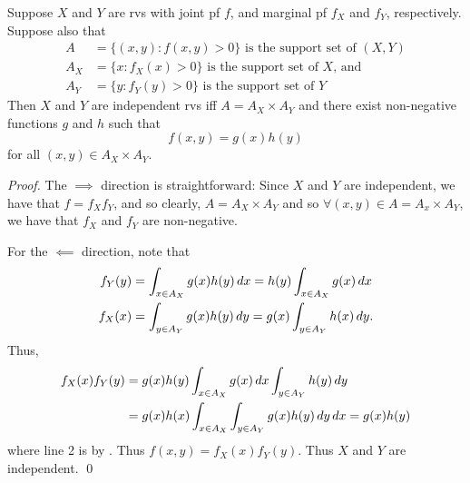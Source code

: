 \documentclass[notoc,notitlepage]{tufte-book}
\begin{document}
\begin{thm}
\label{thm:factorization_theorem_for_independence}
  Suppose $X$ and $Y$ are rvs with joint pf $f$, and marginal pf $f_X$ and $f_Y$, respectively. Suppose also that
  \begin{align*}
    A &= \{(x, y) : f(x, y) > 0\} \text{ is the support set of } (X, Y) \\
    A_X &= \{x : f_X(x) > 0 \} \text{ is the support set of } X \text{, and} \\
    A_Y &= \{y : f_Y(y) > 0 \} \text{ is the support set of } Y
  \end{align*}
  Then $X$ and $Y$ are independent rvs iff $A = A_X \times A_Y$ and there exist non-negative functions $g$ and $h$ such that
  \begin{equation*}
    f(x, y) = g(x) h(y)
  \end{equation*}
  for all $(x, y) \in A_X \times A_Y$.
\end{thm}

\begin{proof}
  The $\implies$ direction is straightforward: Since $X$ and $Y$ are independent, we have that $f = f_X f_Y$, and so clearly, $A = A_X \times A_Y$ and so $\forall (x, y) \in A = A_x \times A_Y$, we have that $f_X$ and $f_Y$ are non-negative.

  For the $\impliedby$ direction, note that
  \begin{align*}
    f_Y(y) &= \int_{x \in A_X} g(x)h(y) \mathop{}\!d{x} = h(y) \int_{x \in A_X} g(x) \mathop{}\!d{x} \\
    f_X(x) &= \int_{y \in A_Y} g(x)h(y) \mathop{}\!d{y} = g(x) \int_{y \in A_Y} h(x) \mathop{}\!d{y}.
  \end{align*}
  Thus,
  \begin{align*}
    f_X(x) f_Y(y) &= g(x)h(y) \int_{x \in A_X} g(x) \mathop{}\!d{x} \int_{y \in A_Y} h(y) \mathop{}\!d{y} \\ 
      &= g(x) h(x) \int_{x \in A_X} \int_{y \in A_Y} g(x)h(y) \mathop{}\!d{y} \mathop{}\!d{x} = g(x) h(y)
  \end{align*}
  where line 2 is by . Thus $f(x, y) = f_X(x) f_Y(y)$. Thus $X$ and $Y$ are independent. \qed
\end{proof}
\end{document}

